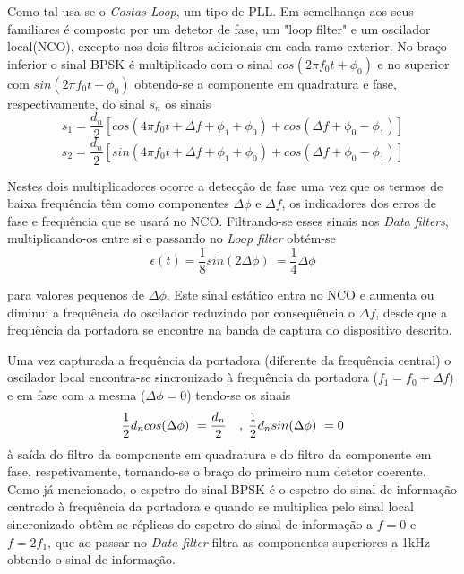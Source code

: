 \documentclass[11pt]{article}
\numberwithin{equation}{section}
\begin{document}
Como tal usa-se o \textit{Costas Loop}, um tipo de PLL. Em semelhança aos seus familiares é composto por um detetor de fase, um "loop filter" e um oscilador local(NCO), excepto nos dois filtros adicionais em cada ramo exterior. No braço inferior o sinal BPSK é multiplicado com o sinal $cos(2\pi f_0t+\phi_0)$ e no superior com $sin(2\pi f_0t+ \phi_0)$ obtendo-se a componente em quadratura e fase, respectivamente, do sinal $s_n$ os sinais 
\begin{equation}
	s_1=\frac{d_n}{2}[cos(4\pi f_0t+\Delta f+\phi_1+\phi_0)+cos(\Delta f+\phi_0-\phi_1)]
\end{equation}
\begin{equation}
	s_2=\frac{d_n}{2}[sin(4\pi f_0t+\Delta f+\phi_1+\phi_0)+cos(\Delta f+\phi_0-\phi_1)]
\end{equation} 

Nestes dois multiplicadores ocorre a detecção de fase uma vez que os termos de baixa frequência têm como componentes $\Delta\phi$ e $\Delta f$, os indicadores dos erros de fase e frequência que se usará no NCO. Filtrando-se esses sinais nos \textit{Data filters}, multiplicando-os entre si e passando no \textit{Loop filter} obtém-se 
\begin{equation}
	\epsilon(t)=\frac{1}{8}sin(2\Delta\phi)~=\frac{1}{4}\Delta\phi
\end{equation}
 

para valores pequenos de $\Delta\phi$. Este sinal estático entra no NCO e aumenta ou diminui a frequência do oscilador reduzindo por consequência o $\Delta f$, desde que a frequência da portadora se encontre na banda de captura do dispositivo descrito.

Uma vez capturada a frequência da portadora (diferente da frequência central) o oscilador local encontra-se sincronizado à frequência da portadora ($f_1 = f_0+\Delta f$) e em fase com a mesma ($\Delta\phi=0$) tendo-se os sinais
\begin{equation}
	\frac{1}{2}d_ncos(\Delta\phi)~= \dfrac{d_n}{2} \quad , \hspace{1mm} \frac{1}{2}d_nsin(\Delta\phi)~= 0
\end{equation}
 à saída do filtro da componente em quadratura e do filtro da componente em fase, respetivamente, tornando-se o braço do primeiro num detetor coerente. Como já mencionado, o espetro do sinal BPSK é o espetro do sinal de informação centrado à frequência da portadora e quando se multiplica pelo sinal local sincronizado obtêm-se réplicas do espetro do sinal de informação a $f=0$ e $f=2f_1$, que ao passar no \textit{Data filter} filtra as componentes superiores a 1kHz obtendo o sinal de informação.
\end{document}
